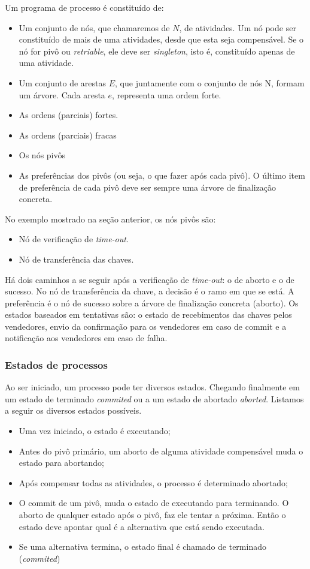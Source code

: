 \documentclass[a4paper,12pt,notitlepage]{article}
\begin{document}
Um programa de processo é constituído de:
\begin{itemize}
  \item Um conjunto de nós, que chamaremos de $N$, de atividades. Um nó pode ser constituído de mais de uma atividades, desde que esta seja compensável. Se o nó for pivô ou \textit{retriable}, ele deve ser \textit{singleton}, isto é, constituído apenas de uma atividade.
  \item Um conjunto de arestas $E$, que juntamente com o conjunto de nós N, formam um árvore. Cada aresta $e$, representa uma ordem forte.
  \item As ordens (parciais) fortes.
  \item As ordens (parciais) fracas
  \item Os nós pivôs
  \item As preferências dos pivôs (ou seja, o que fazer após cada pivô). O último item de preferência de cada pivô deve ser sempre uma árvore de finalização concreta.
\end{itemize}
  
No exemplo mostrado na seção anterior, os nós pivôs são:
\begin{itemize}
  \item Nó de verificação de \textit{time-out}.
  \item Nó de transferência das chaves.
\end{itemize}

Há dois caminhos a se seguir após a verificação de \textit{time-out}: o de aborto e o de sucesso. No nó de transferência da chave, a decisão é o ramo em que se está. A preferência é o nó de sucesso sobre a árvore
de finalização concreta (aborto). Os estados baseados em tentativas são: o estado de recebimentos das chaves pelos vendedores, envio da confirmação para os vendedores em caso de commit e a notificação aos vendedores em caso de falha.

\subsubsection{Estados de processos}

Ao ser iniciado, um processo pode ter diversos estados. Chegando finalmente em um estado de terminado \textit{commited} ou a um estado de abortado \textit{aborted}. Listamos a seguir os diversos estados possíveis.

\begin{itemize}
  \item Uma vez iniciado, o estado é executando;
  \item Antes do pivô primário, um aborto de alguma atividade compensável muda o estado para abortando;
  \item Após compensar todas as atividades, o processo é determinado abortado;
  \item O commit de um pivô, muda o estado de executando para terminando. O aborto de qualquer estado após o pivô, faz ele tentar a próxima. Então o estado deve apontar qual é a alternativa que está sendo executada.
  \item Se uma alternativa termina, o estado final é chamado de terminado (\textit{commited})
\end{itemize}
\end{document}
